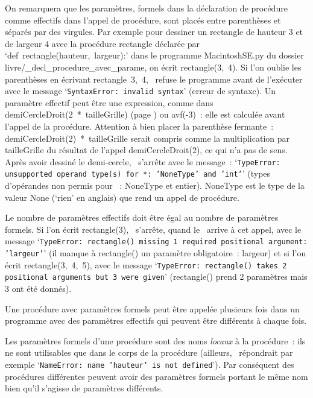On remarquera que les paramètres, formels dans la déclaration de procédure comme effectifs
dans l'appel de procédure, sont placés entre parenthèses et séparés par des
virgules. Par exemple pour dessiner un rectangle de hauteur 3 et de largeur 4 avec la 
procédure {\idt rectangle} déclarée par `{\mcl def}\ {\idt rectangle(hauteur,\ largeur):}' dans le programme
{\idt MacintoshSE.py} du dossier 
{\idt livre/\_decl\_procedure\_avec\_parame}, on écrit {\idt rectangle(3,\ 4)}.
Si l'on oublie les parenthèses en écrivant {\idt rectangle\ 3,\ 4}, \python\ refuse le programme
avant de l'exécuter avec le message `{\tt SyntaxError: invalid syntax}' (erreur de syntaxe).
Un paramètre effectif peut être une expression,
comme dans {\idt demiCercleDroit(2\ *\ tailleGrille)} (page \pageref{prog:HeliceEnCouleur})
ou {\idt avf(-3)}~: elle est calculée avant l'appel de la procédure. Attention à bien placer
la parenthèse fermante~: {\idt demiCercleDroit(2)\ *\ tailleGrille} serait
compris comme la multiplication par {\idt tailleGrille} du résultat de l'appel {\idt demiCercleDroit(2)}, 
ce qui n'a pas de sens. Après avoir dessiné le demi-cercle, \python\ s'arrête avec le message~:
`{\tt TypeError: unsupported operand type(s) for *: 'NoneType' and 'int'}'
(types d'opérandes non permis pour {\idt *}~: {\idt NoneType} et entier). {\idt NoneType} est le type
de la valeur {\mcl None} (`rien' en anglais) que rend un appel de procédure.

Le nombre de paramètres effectifs doit être égal au nombre de paramètres formels.
Si l'on écrit {\idt rectangle(3)}, \python\ s'arrête, quand le \robot\ arrive à cet appel,
avec le message
`{\tt TypeError: rectangle() missing 1 required positional argument: 'largeur'}'
(il manque à {\idt rectangle()} un paramètre obligatoire~: {\idt largeur}) et si l'on écrit
{\idt rectangle(3,\ 4,\ 5)}, avec le message
`{\tt TypeError: rectangle() takes 2 positional arguments but 3 were given}'
({\idt rectangle()} prend 2 paramètres mais 3 ont été donnés).


Une procédure avec 
paramètres formels peut être appelée plusieurs fois dans un programme avec des 
pa\-ra\-mè\-tres effectifs
qui peuvent être différents à chaque fois.

Les paramètres formels d'une procédure sont des noms {\em locaux} à la procédure~: ils ne sont utilisables que dans le
corps de la procédure (ailleurs, \python\ répondrait par exemple
`{\tt NameError: name 'hauteur' is not defined}'). Par conséquent des procédures différentes peuvent avoir des
paramètres formels portant le même nom bien qu'il s'agisse de paramètres différents. 

